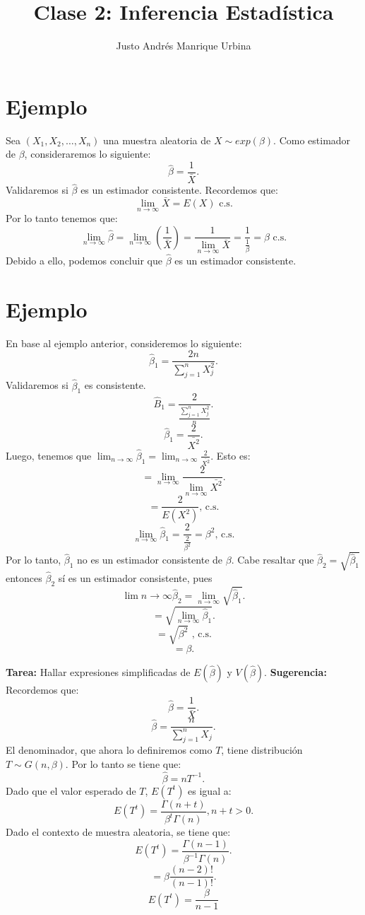 \documentclass{article}
\title{Clase 2: Inferencia Estadística}
\author{Justo Andrés Manrique Urbina}
\begin{document}
\maketitle
\section{Ejemplo}
Sea $(X_{1},X_{2},\ldots,X_{n})$ una muestra aleatoria de $X \sim exp(\beta)$. Como estimador de $\beta$, consideraremos lo siguiente:
\[ \hat{\beta}=\frac{1}{\bar{X}}.\]
Validaremos si $\hat{\beta}$ es un estimador consistente. Recordemos que:
\[ \lim_{n \rightarrow \infty} \bar{X} = E(X) \text{ c.s}.\]
Por lo tanto tenemos que:
\[ \lim_{n \rightarrow \infty} \hat{\beta}= \lim_{n \rightarrow \infty} (\frac{1}{\bar{X}})=\frac{1}{\lim_{n \rightarrow \infty}\bar{X}}=\frac{1}{\frac{1}{\beta}}=\beta \text{ c.s}.\]
Debido a ello, podemos concluir que $\hat{\beta}$ es un estimador consistente.

\section{Ejemplo}
En base al ejemplo anterior, consideremos lo siguiente:
\[ \hat{\beta}_{1}=\frac{2n}{\sum_{j=1}^{n}X^{2}_{j}}.\]
Validaremos si $\hat{\beta}_{1}$ es consistente.
\[ \hat{B}_{1}=\frac{2}{\frac{\sum_{j=1}^{n}X_{j}^{2}}{n}}.\]
\[ \hat{\beta}_{1}=\frac{2}{\bar{X^{2}}}.\]
Luego, tenemos que $\lim_{n \rightarrow \infty} \hat{\beta}_{1}=\lim_{n \rightarrow \infty}\frac{2}{\bar{X^{2}}}$. Esto es:
\[ =\lim_{n \rightarrow \infty}\frac{2}{\lim_{n \rightarrow \infty}\bar{X^{2}}}.\]
\[ =\frac{2}{E(X^{2})} \text{, c.s}.\]
\[ \lim_{n\rightarrow \infty}\hat{\beta}_{1}=\frac{2}{\frac{2}{\beta^{2}}}=\beta^{2} \text{, c.s}.\]
Por lo tanto, $\hat{\beta}_{1}$ no es un estimador consistente de $\beta$. Cabe resaltar que $\hat{\beta}_{2}=\sqrt{\hat{\beta}_{1}}$ entonces $\hat{\beta}_{2}$ sí es un estimador consistente, pues
\[ \lim{n \rightarrow \infty} \hat{\beta}_{2}=\lim_{n \rightarrow \infty}\sqrt{\hat{\beta}_{1}}.\]
\[ =\sqrt{\lim_{n \rightarrow \infty}\hat{\beta}_{1}}.\]
\[ =\sqrt{\beta^{2}}\text{ , c.s}.\]
\[ =\beta.\]

\textbf{Tarea:} Hallar expresiones simplificadas de $E(\hat{\beta})$ y $V(\hat{\beta})$. \textbf{Sugerencia:} Recordemos que:
\[ \hat{\beta}=\frac{1}{\bar{X}}.\]
\[ \hat{\beta}=\frac{n}{\sum_{j=1}^{n}X_{j}}.\]
El denominador, que ahora lo definiremos como $T$, tiene distribución $T \sim G(n,\beta)$. Por lo tanto se tiene que:
\[ \hat{\beta}=n T^{-1}.\]
Dado que el valor esperado de $T$, $E(T^{t})$ es igual a:
\[ E(T^{t})=\frac{\Gamma(n+t)}{\beta^{t}\Gamma(n)}, n+t > 0.\]
Dado el contexto de muestra aleatoria, se tiene que:
\[ E(T^{t})=\frac{\Gamma(n-1)}{\beta^{-1}\Gamma(n)}.\]
\[ =\beta\frac{(n-2)!}{(n-1)!}.\]
\begin{equation}
	E(T^{t}) = \frac{\beta}{n-1}
\end{equation}
\end{document}

